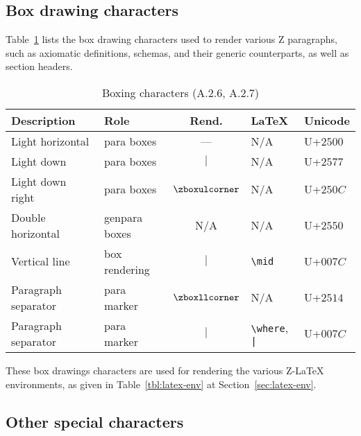 \documentclass{article}
\newcommand{\smallcaption}[1]{{\small (#1)}}
\begin{document}
\subsection{Box drawing characters}\label{sec:special-box}

Table~\ref{tbl:special-box} lists the box drawing characters used to
render various Z paragraphs, such as axiomatic definitions, schemas,
and their generic counterparts, as well as section headers. %
%
\begin{table}[ht]
\centering
\begin{tabular}{|l|l|c|l|l|}
   \hline
   \textbf{Description}& \textbf{Role} & \textbf{Rend.} & \textbf{\LaTeX} & \textbf{Unicode}\\
   \hline
   Light horizontal    & para boxes     & --- & N/A & U+$2500$ \\
   \hline
   Light down          & para boxes     & $|$ & N/A & U+$2577$ \\
   \hline
   Light down right    & para boxes     & $\zboxulcorner$ & N/A & U+$250C$ \\
   \hline
   Double horizontal   & genpara boxes  & N/A & N/A & U+$2550$ \\
   \hline
   Vertical line       & box rendering & $\mid$ & \verb|\mid| & U+$007C$ \\
   \hline
   Paragraph separator & para marker   & $\zboxllcorner$ & N/A & U+$2514$ \\
   \hline
   Paragraph separator & para marker   & $|$ & \verb|\where|, \verb'|' & U+$007C$ \\
   \hline
\end{tabular}
\caption{Boxing characters \smallcaption{A.2.6, A.2.7}}\label{tbl:special-box}
\end{table}
%
These box drawings characters are used for rendering the various
Z-\LaTeX{} environments, as given in Table~\ref{tbl:latex-env} at
Section~\ref{sec:latex-env}.

\subsection{Other special characters}\label{sec:special-other}
\end{document}
